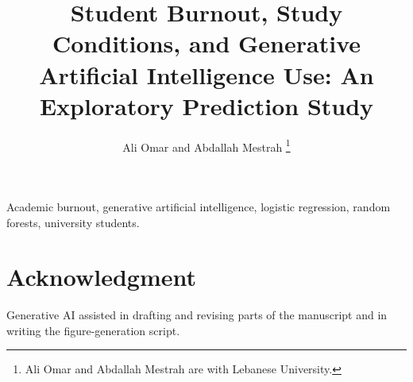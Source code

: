 \documentclass{IEEEtran}
\title{Student Burnout, Study Conditions, and Generative Artificial Intelligence Use: An Exploratory Prediction Study}
\author{Ali Omar and Abdallah Mestrah%
\thanks{Ali Omar and Abdallah Mestrah are with Lebanese University.}}
\begin{document}
\maketitle



\begin{IEEEkeywords}
Academic burnout, generative artificial intelligence, logistic regression, random forests, university students.
\end{IEEEkeywords}







\section*{Acknowledgment}
Generative AI assisted in drafting and revising parts of the manuscript and in writing the figure-generation script.



\end{document}
